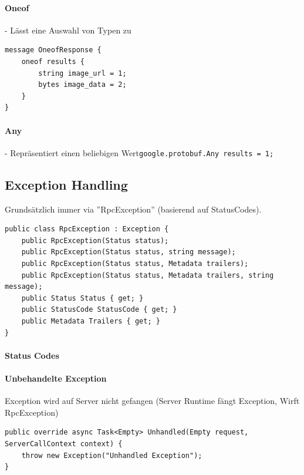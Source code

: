 \documentclass[
a4paper,
oneside,
10pt,
fleqn,
headsepline,
toc=listofnumbered, 
bibliography=totocnumbered]{scrartcl}
\begin{document}
\paragraph{Oneof} - Lässt eine Auswahl von Typen zu
\begin{lstlisting}
message OneofResponse {
    oneof results {
        string image_url = 1;
        bytes image_data = 2;
    }
}
\end{lstlisting}
\paragraph{Any} - Repräsentiert einen beliebigen Wert\lstinline{google.protobuf.Any results = 1;}

\subsection{Exception Handling}
Grundsätzlich immer via ''RpcException'' (basierend auf StatusCodes).
\begin{lstlisting}
public class RpcException : Exception {
    public RpcException(Status status);
    public RpcException(Status status, string message);
    public RpcException(Status status, Metadata trailers);
    public RpcException(Status status, Metadata trailers, string message);
    public Status Status { get; }
    public StatusCode StatusCode { get; }
    public Metadata Trailers { get; }
}
\end{lstlisting}
\paragraph{Status Codes} \hfill
\begin{figure}[h!]
\end{figure}

\paragraph{Unbehandelte Exception} Exception wird auf Server nicht gefangen (Server Runtime fängt Exception, Wirft RpcException)
\begin{lstlisting}
public override async Task<Empty> Unhandled(Empty request, ServerCallContext context) {
    throw new Exception("Unhandled Exception");
}
\end{lstlisting}
\end{document}
